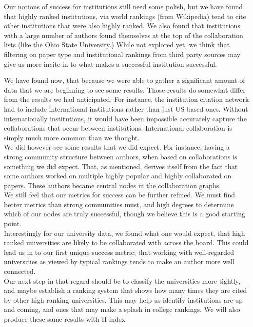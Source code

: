 \documentclass[times, 10pt,twocolumn]{article}
\begin{document}
Our notions of success for institutions still need some polish, but we have found that highly ranked institutions, via world rankings (from Wikipedia) tend to cite other institutions that were also highly ranked. We also found that institutions with a large number of authors found themselves at the top of the collaboration lists (like the Ohio State University.) While not explored yet, we think that filtering on paper type and institutional rankings from third party sources may give us more incite in to what makes a successful institution successful.


We have found now, that because we were able to gather a significant amount of data that we are beginning to see some results. Those results do somewhat differ from the results we had anticipated. For instance, the institution citation network had to include international institutions rather than just US based ones. Without internationally institutions, it would have been impossible accurately capture the collaborations that occur between institutions. International collaboration is simply much more common than we thought. \\

We did however see some results that we did expect. For instance, having a strong community structure between authors, when based on collaborations is something we did expect. That, as mentioned, derives itself from the fact that some authors worked on multiple highly popular and highly collaborated on papers. These authors became central nodes in the collaboration graphs. \\

We still feel that our metrics for success can be further refined. We must find better metrics than strong communities must, and high degrees to determine which of our nodes are truly successful, though we believe this is a good starting point.\\

Interestingly for our university data, we found what one would expect, that high ranked universities are likely to be collaborated with across the board. This could lead us in to our first unique success metric; that working with well-regarded universities as viewed by typical rankings tends to make an author more well connected. \\

Our next step in that regard should be to classify the universities more tightly, and maybe establish a ranking system that shows how many times they are cited by other high ranking universities. This may help us identify institutions are up and coming, and ones that may make a splash in college rankings. We will also produce these same results with H-index
\end{document}
